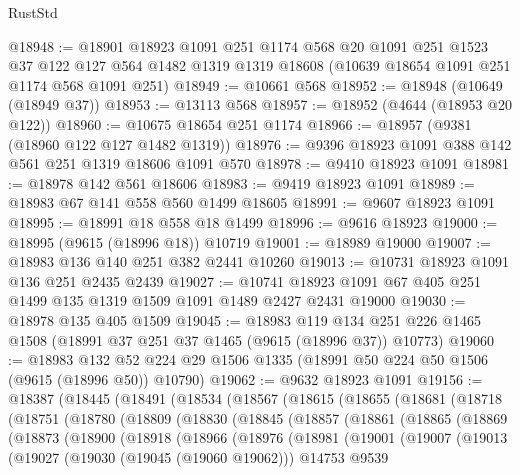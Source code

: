 \begin{lexlean}{RustStd}
\begin{coremodule}
@18948 := @18901
    @18923
    @1091
    @251
    @1174
    @568
    @20
    @1091
    @251
    @1523
    @37
    @122
    @127
    @564
    @1482
    @1319
    @1319
    @18608
    (@10639 @18654 @1091 @251 @1174 @568 @1091 @251)
@18949 := @10661 @568
@18952 := @18948 (@10649 (@18949 @37))
@18953 := @13113 @568
@18957 := @18952 (@4644 (@18953 @20 @122))
@18960 := @10675 @18654 @251 @1174
@18966 := @18957 (@9381 (@18960 @122 @127 @1482 @1319))
@18976 := @9396 @18923 @1091 @388 @142 @561 @251 @1319 @18606 @1091 @570
@18978 := @9410 @18923 @1091
@18981 := @18978 @142 @561 @18606
@18983 := @9419 @18923 @1091
@18989 := @18983 @67 @141 @558 @560 @1499 @18605
@18991 := @9607 @18923 @1091
@18995 := @18991 @18 @558 @18 @1499
@18996 := @9616 @18923
@19000 := @18995 (@9615 (@18996 @18)) @10719
@19001 := @18989 @19000
@19007 := @18983 @136 @140 @251 @382 @2441 @10260
@19013 := @10731 @18923 @1091 @136 @251 @2435 @2439
@19027 := @10741 @18923 @1091 @67 @405 @251 @1499 @135 @1319 @1509 @1091 @1489 @2427 @2431 @19000
@19030 := @18978 @135 @405 @1509
@19045 := @18983
    @119
    @134
    @251
    @226
    @1465
    @1508
    (@18991 @37 @251 @37 @1465 (@9615 (@18996 @37)) @10773)
@19060 := @18983
    @132
    @52
    @224
    @29
    @1506
    @1335
    (@18991 @50 @224 @50 @1506 (@9615 (@18996 @50)) @10790)
@19062 := @9632 @18923 @1091
@19156 := @18387
    (@18445
      (@18491
        (@18534
          (@18567
            (@18615
              (@18655
                (@18681
                  (@18718
                    (@18751
                      (@18780
                        (@18809
                          (@18830
                            (@18845
                              (@18857
                                (@18861
                                  (@18865
                                    (@18869
                                      (@18873
                                        (@18900
                                          (@18918
                                            (@18966
                                              (@18976
                                                (@18981
                                                  (@19001
                                                    (@19007
                                                      (@19013
                                                        (@19027
                                                          (@19030 (@19045 (@19060 @19062)))
                                                          @14753
                                                          @9539

\end{coremodule}
\end{lexlean}
